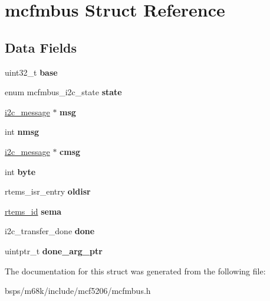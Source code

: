 \hypertarget{structmcfmbus}{}\section{mcfmbus Struct Reference}
\label{structmcfmbus}
\subsection*{Data Fields}
\begin{DoxyCompactItemize}
\item 
\mbox{\label{structmcfmbus_a2537608ce31b6c963944a67bf9fa41c6}} 
uint32\+\_\+t {\bfseries base}
\item 
\mbox{\label{structmcfmbus_a8b753f1fd3c930d412cafc14e874da91}} 
enum mcfmbus\+\_\+i2c\+\_\+state {\bfseries state}
\item 
\mbox{\label{structmcfmbus_a5d21e6c6e1b3549b7efc1803ca866601}} 
\mbox{\hyperlink{structi2c__message}{i2c\+\_\+message}} $\ast$ {\bfseries msg}
\item 
\mbox{\label{structmcfmbus_a5c87d95f682813117b6bfd4d4e87b61c}} 
int {\bfseries nmsg}
\item 
\mbox{\label{structmcfmbus_a4ec346e504ae05046408e38612f3efa9}} 
\mbox{\hyperlink{structi2c__message}{i2c\+\_\+message}} $\ast$ {\bfseries cmsg}
\item 
\mbox{\label{structmcfmbus_ae91a9922249f736711b1fe26980ae41d}} 
int {\bfseries byte}
\item 
\mbox{\label{structmcfmbus_a3b176b7ac9549d0b28cff5ab3f5790a7}} 
rtems\+\_\+isr\+\_\+entry {\bfseries oldisr}
\item 
\mbox{\label{structmcfmbus_aced7c4d10e8b17ef660f5e59493dba35}} 
\mbox{\hyperlink{group__ClassicTasks_gab20892b814dced7dd4e5b9bf42becd57}{rtems\+\_\+id}} {\bfseries sema}
\item 
\mbox{\label{structmcfmbus_aad9c6f0766b5687ec5dcabe437468439}} 
i2c\+\_\+transfer\+\_\+done {\bfseries done}
\item 
\mbox{\label{structmcfmbus_acad2d5bc1d4dd0708d87b785b291b56a}} 
uintptr\+\_\+t {\bfseries done\+\_\+arg\+\_\+ptr}
\end{DoxyCompactItemize}


The documentation for this struct was generated from the following file\+:\begin{DoxyCompactItemize}
\item 
bsps/m68k/include/mcf5206/mcfmbus.\+h\end{DoxyCompactItemize}
